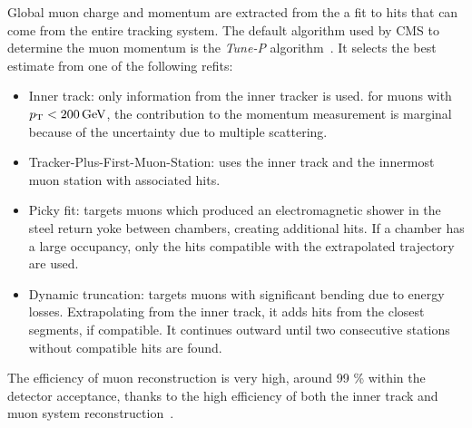 Global muon charge and momentum are extracted from the a fit to hits that can come from the entire tracking system.
The default algorithm used by CMS to determine the muon momentum is the \textit{Tune-P} algorithm~\cite{CMS-MUO-10-004}.
It selects the best estimate from one of the following refits:
\begin{itemize}
\item Inner track: only information from the inner tracker is used.
  for muons with $p_{\mathrm{T}} < 200\,\text{Ge\hspace{-.08em}V}$, the contribution to the momentum measurement is marginal because of the uncertainty due to multiple scattering.
\item Tracker-Plus-First-Muon-Station: uses the inner track and the innermost muon station with associated hits.
\item Picky fit: targets muons which produced an electromagnetic shower in the steel return yoke between chambers, creating additional hits.
  If a chamber has a large occupancy, only the hits compatible with the extrapolated trajectory are used.
\item Dynamic truncation: targets muons with significant bending due to energy losses.
  Extrapolating from the inner track, it adds hits from the closest segments, if compatible.
  It continues outward until two consecutive stations without compatible hits are found.
\end{itemize}

The efficiency of muon reconstruction is very high, around 99 \% within the detector acceptance,
thanks to the high efficiency of both the inner track and muon system reconstruction~\cite{CMS-MUO-16-001}.
